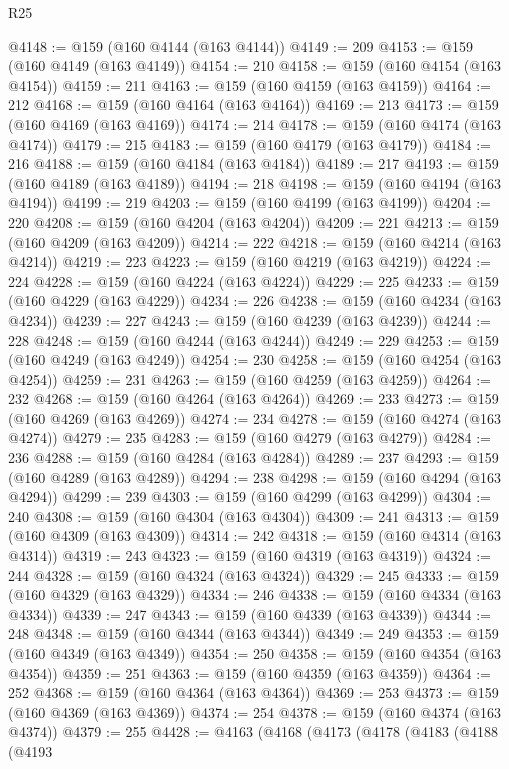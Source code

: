 \begin{lexlean}{R25}
\begin{coremodule}
@4148 := @159 (@160 @4144 (@163 @4144))
@4149 := 209
@4153 := @159 (@160 @4149 (@163 @4149))
@4154 := 210
@4158 := @159 (@160 @4154 (@163 @4154))
@4159 := 211
@4163 := @159 (@160 @4159 (@163 @4159))
@4164 := 212
@4168 := @159 (@160 @4164 (@163 @4164))
@4169 := 213
@4173 := @159 (@160 @4169 (@163 @4169))
@4174 := 214
@4178 := @159 (@160 @4174 (@163 @4174))
@4179 := 215
@4183 := @159 (@160 @4179 (@163 @4179))
@4184 := 216
@4188 := @159 (@160 @4184 (@163 @4184))
@4189 := 217
@4193 := @159 (@160 @4189 (@163 @4189))
@4194 := 218
@4198 := @159 (@160 @4194 (@163 @4194))
@4199 := 219
@4203 := @159 (@160 @4199 (@163 @4199))
@4204 := 220
@4208 := @159 (@160 @4204 (@163 @4204))
@4209 := 221
@4213 := @159 (@160 @4209 (@163 @4209))
@4214 := 222
@4218 := @159 (@160 @4214 (@163 @4214))
@4219 := 223
@4223 := @159 (@160 @4219 (@163 @4219))
@4224 := 224
@4228 := @159 (@160 @4224 (@163 @4224))
@4229 := 225
@4233 := @159 (@160 @4229 (@163 @4229))
@4234 := 226
@4238 := @159 (@160 @4234 (@163 @4234))
@4239 := 227
@4243 := @159 (@160 @4239 (@163 @4239))
@4244 := 228
@4248 := @159 (@160 @4244 (@163 @4244))
@4249 := 229
@4253 := @159 (@160 @4249 (@163 @4249))
@4254 := 230
@4258 := @159 (@160 @4254 (@163 @4254))
@4259 := 231
@4263 := @159 (@160 @4259 (@163 @4259))
@4264 := 232
@4268 := @159 (@160 @4264 (@163 @4264))
@4269 := 233
@4273 := @159 (@160 @4269 (@163 @4269))
@4274 := 234
@4278 := @159 (@160 @4274 (@163 @4274))
@4279 := 235
@4283 := @159 (@160 @4279 (@163 @4279))
@4284 := 236
@4288 := @159 (@160 @4284 (@163 @4284))
@4289 := 237
@4293 := @159 (@160 @4289 (@163 @4289))
@4294 := 238
@4298 := @159 (@160 @4294 (@163 @4294))
@4299 := 239
@4303 := @159 (@160 @4299 (@163 @4299))
@4304 := 240
@4308 := @159 (@160 @4304 (@163 @4304))
@4309 := 241
@4313 := @159 (@160 @4309 (@163 @4309))
@4314 := 242
@4318 := @159 (@160 @4314 (@163 @4314))
@4319 := 243
@4323 := @159 (@160 @4319 (@163 @4319))
@4324 := 244
@4328 := @159 (@160 @4324 (@163 @4324))
@4329 := 245
@4333 := @159 (@160 @4329 (@163 @4329))
@4334 := 246
@4338 := @159 (@160 @4334 (@163 @4334))
@4339 := 247
@4343 := @159 (@160 @4339 (@163 @4339))
@4344 := 248
@4348 := @159 (@160 @4344 (@163 @4344))
@4349 := 249
@4353 := @159 (@160 @4349 (@163 @4349))
@4354 := 250
@4358 := @159 (@160 @4354 (@163 @4354))
@4359 := 251
@4363 := @159 (@160 @4359 (@163 @4359))
@4364 := 252
@4368 := @159 (@160 @4364 (@163 @4364))
@4369 := 253
@4373 := @159 (@160 @4369 (@163 @4369))
@4374 := 254
@4378 := @159 (@160 @4374 (@163 @4374))
@4379 := 255
@4428 := @4163
    (@4168
      (@4173
        (@4178
          (@4183
            (@4188
              (@4193

\end{coremodule}
\end{lexlean}
